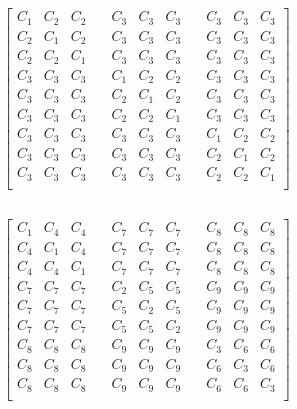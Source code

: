 \documentclass[a4paper,12pt]{article}
\begin{document}
	
		\subsection{}
		$\begin{bmatrix}
			C_{1} & C_{2} & C_{2} & \quad C_{3} & C_{3} & C_{3} & \quad C_{3} & C_{3} & C_{3} \\
			C_{2} & C_{1} & C_{2} & \quad C_{3} & C_{3} & C_{3} & \quad C_{3} & C_{3} & C_{3} \\
			C_{2} & C_{2} & C_{1} & \quad C_{3} & C_{3} & C_{3} & \quad C_{3} & C_{3} & C_{3} \\[1em]
			C_{3} & C_{3} & C_{3} & \quad C_{1} & C_{2} & C_{2} & \quad C_{3} & C_{3} & C_{3} \\
			C_{3} & C_{3} & C_{3} & \quad C_{2} & C_{1} & C_{2} & \quad C_{3} & C_{3} & C_{3} \\
			C_{3} & C_{3} & C_{3} & \quad C_{2} & C_{2} & C_{1} & \quad C_{3} & C_{3} & C_{3} \\[1em]
			C_{3} & C_{3} & C_{3} & \quad C_{3} & C_{3} & C_{3} & \quad C_{1} & C_{2} & C_{2} \\
			C_{3} & C_{3} & C_{3} & \quad C_{3} & C_{3} & C_{3} & \quad C_{2} & C_{1} & C_{2} \\
			C_{3} & C_{3} & C_{3} & \quad C_{3} & C_{3} & C_{3} & \quad C_{2} & C_{2} & C_{1} \\
		\end{bmatrix}$
	
		\subsection{}
		$\begin{bmatrix}
			C_{1} & C_{4} & C_{4} & \quad C_{7} & C_{7} & C_{7} & \quad C_{8} & C_{8} & C_{8} \\
			C_{4} & C_{1} & C_{4} & \quad C_{7} & C_{7} & C_{7} & \quad C_{8} & C_{8} & C_{8} \\
			C_{4} & C_{4} & C_{1} & \quad C_{7} & C_{7} & C_{7} & \quad C_{8} & C_{8} & C_{8} \\[1em]
			C_{7} & C_{7} & C_{7} & \quad C_{2} & C_{5} & C_{5} & \quad C_{9} & C_{9} & C_{9} \\
			C_{7} & C_{7} & C_{7} & \quad C_{5} & C_{2} & C_{5} & \quad C_{9} & C_{9} & C_{9} \\
			C_{7} & C_{7} & C_{7} & \quad C_{5} & C_{5} & C_{2} & \quad C_{9} & C_{9} & C_{9} \\[1em]
			C_{8} & C_{8} & C_{8} & \quad C_{9} & C_{9} & C_{9} & \quad C_{3} & C_{6} & C_{6} \\
			C_{8} & C_{8} & C_{8} & \quad C_{9} & C_{9} & C_{9} & \quad C_{6} & C_{3} & C_{6} \\
			C_{8} & C_{8} & C_{8} & \quad C_{9} & C_{9} & C_{9} & \quad C_{6} & C_{6} & C_{3} \\
		\end{bmatrix}$

		
		
		
	
	
\end{document}
